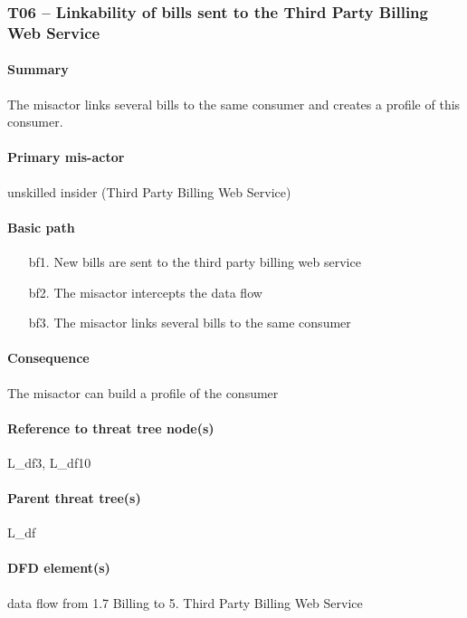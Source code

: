\subsubsection{T06 -- Linkability of bills sent to the Third Party Billing Web Service}

\paragraph{Summary} The misactor links several bills to the same consumer and
creates a profile of this consumer. 

\paragraph{Primary mis-actor} unskilled insider (Third Party Billing Web
Service)

\paragraph{Basic path}
\begin{enumerate}
	\item[bf1.] New bills are sent to the third party billing web service
	\item[bf2.] The misactor intercepts the data flow
	\item[bf3.] The misactor links several bills to the same consumer
\end{enumerate}

\paragraph{Consequence} The misactor can build a profile of the consumer

\paragraph{Reference to threat tree node(s)} L\_df3, L\_df10

\paragraph{Parent threat tree(s)} L\_df

\paragraph{DFD element(s)} data flow from 1.7 Billing to 5. Third Party Billing
Web Service

